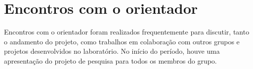 \chapter{Encontros com o orientador}\label{ch:introducao}
Encontros com o orientador foram realizados frequentemente para discutir, tanto o andamento do projeto, como trabalhos em colaboração com outros grupos e projetos desenvolvidos no laboratório. No início do período, houve uma apresentação do projeto de pesquisa para todos os membros do grupo.